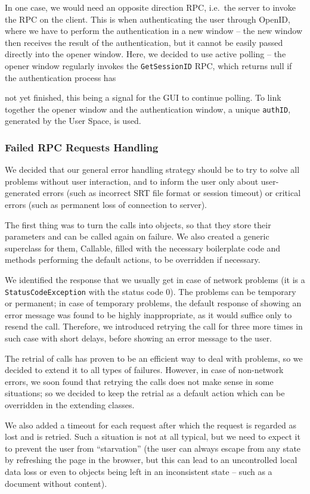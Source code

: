 In one case, we would need an opposite direction RPC, i.e.\ the server to invoke the RPC on the client. This is when authenticating the user through OpenID, where we have to perform the authentication in a new window -- the new window then receives the result of the authentication, but it cannot be easily passed directly into the opener window. Here, we decided to use active polling -- the opener window regularly invokes the {\tt GetSessionID} RPC, which returns null if the authentication process has{ not yet finished, this being a signal for the GUI to continue polling. To link together the opener window and the authentication window, a unique {\tt authID}, generated by the User Space, is used.

\subsubsection{Failed RPC Requests Handling}

We decided that our general error handling strategy should be to try to solve all problems without user interaction, and to inform the user only about user-generated errors (such as incorrect SRT file format or session timeout) or critical errors (such as permanent loss of connection to server).

The first thing was to turn the calls into objects, so that they store their parameters and can be called again on failure. We also created a generic superclass for them, Callable, filled with the necessary boilerplate code and methods performing the default actions, to be overridden if necessary.

We identified the response that we usually get in case of network problems (it is a {\tt StatusCodeException} with the status code 0). The problems can be temporary or permanent; in case of temporary problems, the default response of showing an error message was found to be highly inappropriate, as it would suffice only to resend the call. Therefore, we introduced retrying the call for three more times in such case with short delays, before showing an error message to the user.

The retrial of calls has proven to be an efficient way to deal with problems, so we decided to extend it to all types of failures. However, in case of non-network errors, we soon found that retrying the calls does not make sense in some situations; so we decided to keep the retrial as a default action which can be overridden in the extending classes.

We also added a timeout for each request after which the request is regarded as lost and is retried. Such a situation is not at all typical, but we need to expect  it to prevent the user from ``starvation'' (the user can always escape from any state by refreshing the page in the browser, but this can lead to an uncontrolled local data loss or even to objects being left in an inconsistent state -- such as a document without content).



}
